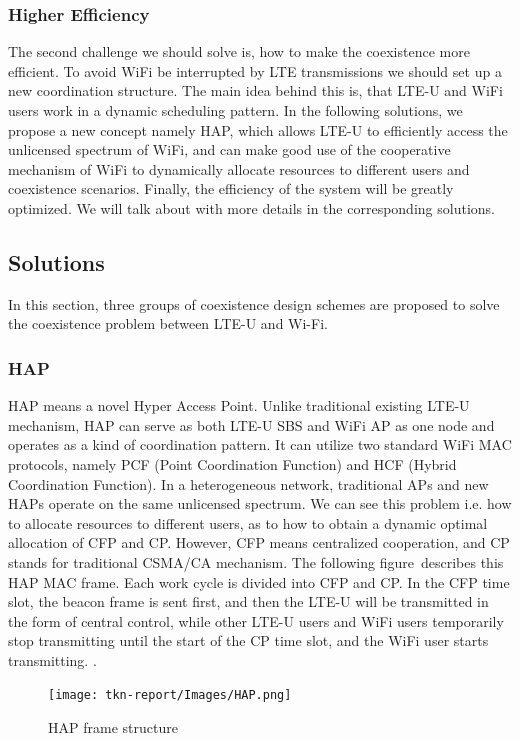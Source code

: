 \documentclass{IEEEtran}
\begin{document}
\subsubsection{Higher Efficiency}
The second challenge we should solve is, how to make the coexistence more efficient. To avoid WiFi be interrupted by LTE transmissions we should set up a new coordination structure. The main idea behind this is, that LTE-U and WiFi users work in a dynamic scheduling pattern. In the following solutions, we propose a new concept namely HAP, which allows LTE-U to efficiently access the unlicensed spectrum of WiFi, and can make good use of the cooperative mechanism of WiFi to dynamically allocate resources to different users and coexistence scenarios. Finally, the efficiency of the system will be greatly optimized. We will talk about with more details in the corresponding solutions.

\subsection{Solutions}
In this section, three groups of coexistence design schemes are proposed to solve the coexistence problem between LTE-U and Wi-Fi.

\subsubsection{HAP}
HAP means a novel Hyper Access Point\cite{Chen2016}. Unlike traditional existing LTE-U mechanism, HAP can serve as both LTE-U SBS and WiFi AP as one node and operates as a kind of coordination pattern. It can utilize two standard WiFi MAC protocols, namely PCF (Point Coordination Function) and HCF (Hybrid Coordination Function). In a heterogeneous network, traditional APs and new HAPs operate on the same unlicensed spectrum. We can see this problem i.e. how to allocate resources to different users, as to how to obtain a dynamic optimal allocation of CFP and CP. However, CFP means centralized cooperation, and CP stands for traditional CSMA/CA mechanism. The following figure\ describes this HAP MAC frame. Each work cycle is divided into CFP and CP. In the CFP time slot, the beacon frame is sent first, and then the LTE-U will be transmitted in the form of central control, while other LTE-U users and WiFi users temporarily stop transmitting until the start of the CP time slot, and the WiFi user starts transmitting. .

\graphicspath{{Images/}}
\maketitle
\begin{figure}[htp]
\centering
\texttt{[image: tkn-report/Images/HAP.png]}
\caption{HAP frame structure\cite{Chen2016}}
\label{interfece}
\end{figure}
\end{document}
